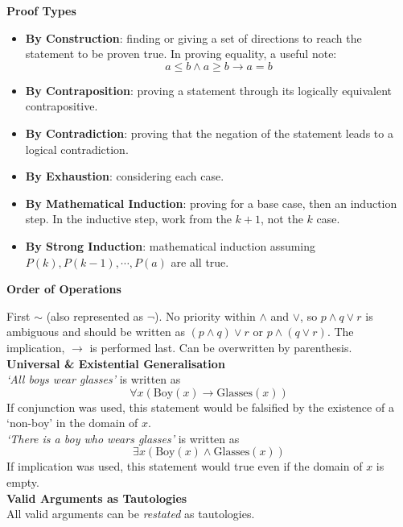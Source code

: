 \documentclass[a4paper]{article}
\newcommand{\subheading}[1]{{\scriptsize\textbf{#1}}}
\begin{document}
\begin{multicols*}{4}
\subheading{Proof Types}
\begin{itemize}[leftmargin=*] \itemsep -0.4em
  \item \textbf{By Construction}: finding or giving a set of directions to
    reach the statement to be proven true. In proving equality, a useful note:
    $$a \leq b \land a \geq b \rightarrow a = b$$
  \item \textbf{By Contraposition}: proving a statement through its logically
    equivalent contrapositive.
  \item \textbf{By Contradiction}: proving that the negation of the statement
    leads to a logical contradiction.
  \item \textbf{By Exhaustion}: considering each case.
  \item \textbf{By Mathematical Induction}: proving for a base case, then an
    induction step. In the inductive step, work from the $k+1$, not the $k$
    case.
  \item \textbf{By Strong Induction}: mathematical induction assuming $P(k),
    P(k-1), \cdots, P(a)$ are all true.
\end{itemize}

\subheading{Order of Operations}

First $\sim$ (also represented as $\neg$). No priority within $\land$ and
$\lor$, so $p \land q \lor r$ is ambiguous and should be written as
$(p \land q) \lor r$ or $p \land (q \lor r)$. The implication, $\rightarrow$ is
performed last. Can be overwritten by parenthesis.\\

\subheading{Universal \& Existential Generalisation}\\
\textit{`All boys wear glasses'} is written as
  $$\forall x (\text{Boy}(x) \rightarrow \text{Glasses}(x)) $$
If conjunction was used, this statement would be falsified by the existence of a
`non-boy' in the domain of $x$.\\

\textit{`There is a boy who wears glasses'} is written as
  $$\exists x (\text{Boy}(x) \land \text{Glasses}(x)) $$
If implication was used, this statement would true even if the domain of $x$ is
empty.\\

\subheading{Valid Arguments as Tautologies}\\
All valid arguments can be \textit{restated} as tautologies.\\


\end{multicols*}
\end{document}
